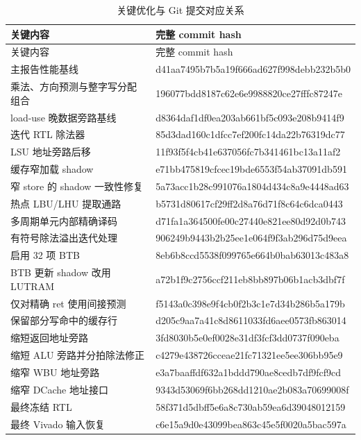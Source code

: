 \documentclass[UTF8,a4paper,12pt]{ctexart}
\begin{document}
\small
\begin{longtable}{@{}p{}p{}@{}}
  \caption{关键优化与 Git 提交对应关系}\\
  \toprule
  关键内容 & 完整 commit hash \\
  \midrule
  \endfirsthead
  \toprule
  关键内容 & 完整 commit hash \\
  \midrule
  \endhead
  主报告性能基线 & \ttfamily d41aa7495b7b5a19f666ad627f998debb232b5b0 \\
  乘法、方向预测与整字写分配组合 & \ttfamily 196077bdd8187c62e6e9988820ce27fffc87247e \\
  load-use 晚数据旁路基线 & \ttfamily d8364daf1df0ea203ab661bf5c093e208b9414f9 \\
  迭代 RTL 除法器 & \ttfamily 85d3dad160c1dfcc7ef200fc14da22b76319dc77 \\
  LSU 地址旁路后移 & \ttfamily 11f93f5f4cb41e637056fc7b341461bc13a11af2 \\
  缓存窄加载 shadow & \ttfamily e71bb475819cfcec19bde6553f54ab37091db591 \\
  窄 store 的 shadow 一致性修复 & \ttfamily 5a73acc1b28c991076a1804d434c8a9e4448ad63 \\
  热点 LBU/LHU 提取通路 & \ttfamily b5731d80617cf29ff2d8a76d71f8c64c6dca0443 \\
  多周期单元内部精确译码 & \ttfamily d71fa1a364500fe00c27440e821ee80d92d0b743 \\
  有符号除法溢出迭代处理 & \ttfamily 906249b9443b2b25ee1e064f9f3ab296d75d9eea \\
  启用 32 项 BTB & \ttfamily 8eb6b8ccd5538f099765e664b0bab63013c483a8 \\
  BTB 更新 shadow 改用 LUTRAM & \ttfamily a72b1f9c2756ccf211eb8bb897b06b1acb3dbf7f \\
  仅对精确 ret 使用间接预测 & \ttfamily f5143a0c398e9f4cb0f2b3c1e7d34b286b5a179b \\
  保留部分写命中的缓存行 & \ttfamily d205c9aa7a41c8d8611033fd6aee0573fb863014 \\
  缩短返回地址旁路 & \ttfamily 3fd8030b5e0ef0028e31df3fcf3dd0737f090eba \\
  缩短 ALU 旁路并分拍除法修正 & \ttfamily c4279e438726cceae21fc71321ee5ee306bb95e9 \\
  缩窄 WBU 地址旁路 & \ttfamily e3a7baaffdf632a1bddd790ae8cedb7df9fcf9cd \\
  缩窄 DCache 地址接口 & \ttfamily 9343d53069f6bb268dd1210ae2b083a70699008f \\
  最终冻结 RTL & \ttfamily 58f371d5dbff5e6a8c730ab59ea6d39048012159 \\
  最终 Vivado 输入恢复 & \ttfamily c6e15a9d0e43099bea863c45e5f0020a5bac597a \\
  \bottomrule
\end{longtable}
\normalsize
\end{document}
